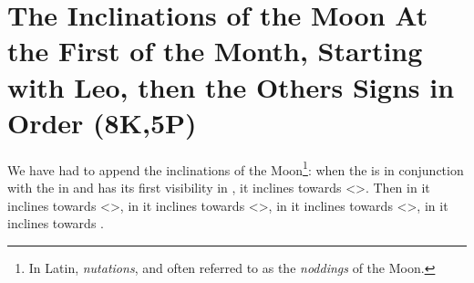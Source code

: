 \section{The Inclinations of the Moon At the First of the Month, Starting with Leo, then the Others Signs in Order (8K,5P)}

We have had to append the inclinations of the Moon\footnote{In Latin, \textsl{nutations}, and often referred to as the \textsl{noddings} of the Moon.}: when the \Moon\xspace is in conjunction with the \Sun\xspace in
\Cancer\xspace and has its first visibility in \Leo, it inclines towards <\Taurus>. Then in \Virgo\xspace it inclines towards <\Aries>, in \Libra\xspace it inclines towards <\Pisces>, in \Scorpio\xspace it inclines towards <\Aquarius>, in \Sagittarius\xspace it inclines towards \Capricorn. 

